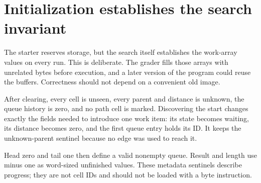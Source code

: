 \section{Initialization establishes the search invariant}\label{maze-p03}

The starter reserves storage, but the search itself establishes the work-array values on every run. This is deliberate. The grader fills those arrays with unrelated bytes before execution, and a later version of the program could reuse the buffers. Correctness should not depend on a convenient old image.

After clearing, every cell is unseen, every parent and distance is unknown, the queue history is zero, and no path cell is marked. Discovering the start changes exactly the fields needed to introduce one work item: its state becomes waiting, its distance becomes zero, and the first queue entry holds its ID. It keeps the unknown-parent sentinel because no edge was used to reach it.

Head zero and tail one then define a valid nonempty queue. Result and length use minus one as word-sized unfinished values. These metadata sentinels describe progress; they are not cell IDs and should not be loaded with a byte instruction.
